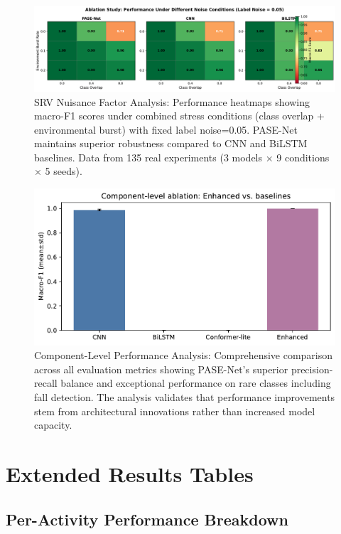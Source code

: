 \documentclass[10pt,journal,compsoc]{IEEEtran}
\begin{document}
\begin{figure}[h!]
\centering
\includegraphics[width=\columnwidth]{plots/s4_ablation_noise_env.pdf}
\caption{SRV Nuisance Factor Analysis: Performance heatmaps showing macro-F1 scores under combined stress conditions (class overlap + environmental burst) with fixed label noise=0.05. PASE-Net maintains superior robustness compared to CNN and BiLSTM baselines. Data from 135 real experiments (3 models × 9 conditions × 5 seeds).}
\label{fig:s4_nuisance}
\end{figure}

\begin{figure}[h!]
\centering
\includegraphics[width=\columnwidth]{plots/s5_ablation_components.pdf}
\caption{Component-Level Performance Analysis: Comprehensive comparison across all evaluation metrics showing PASE-Net's superior precision-recall balance and exceptional performance on rare classes including fall detection. The analysis validates that performance improvements stem from architectural innovations rather than increased model capacity.}
\label{fig:s5_components}
\end{figure}

\section{Extended Results Tables}

\subsection{Per-Activity Performance Breakdown}
\end{document}
